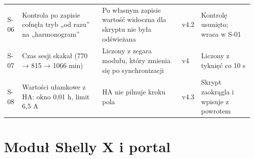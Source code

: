 \documentclass[11pt,a4paper]{article}
\begin{document}
\begin{longtable}{>{\raggedright\arraybackslash}p{3.00cm}>{\raggedright\arraybackslash}p{3.43cm}>{\raggedright\arraybackslash}p{3.43cm}>{\raggedright\arraybackslash}p{1.10cm}>{\raggedright\arraybackslash}p{3.43cm}}
S-06 & Kontrola po zapisie cofnęła tryb „od razu” na „harmonogram” & Po własnym zapisie wartość widoczna dla skryptu nie była odświeżana & \leavevmode{\symbolfont\color{apgreen}\textbf{✔}} v4.2 & Kontrolę usunięto; wraca w S-01 \\
S-07 & Czas sesji skakał (770 {\symbolfont→} 815 {\symbolfont→} 1066 min) & Liczony z zegara modułu, który zmienia się po synchronizacji & \leavevmode{\symbolfont\color{apgreen}\textbf{✔}} v4 & Liczony z tyknięć co 10 s \\
S-08 & Wartości ułamkowe z HA: okno 0,01 h, limit 6,5 A & HA nie pilnuje kroku pola & \leavevmode{\symbolfont\color{apgreen}\textbf{✔}} v4.3 & Skrypt zaokrągla i wpisuje z powrotem \\
\end{longtable}

\section*{Moduł Shelly X i portal}
\end{document}
